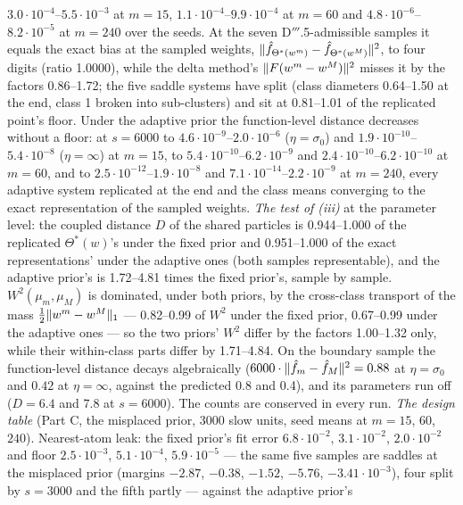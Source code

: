 $3.0\cdot10^{-4}$--$5.5\cdot10^{-3}$ at $m = 15$, $1.1\cdot10^{-4}$--$9.9\cdot10^{-4}$ at $m = 60$ and
$4.8\cdot10^{-6}$--$8.2\cdot10^{-5}$ at $m = 240$ over the seeds. At the seven D$'''$.5-admissible samples it equals
the exact bias at the sampled weights, $\lVert \hat f_{\Theta^*(w^m)} - \hat f_{\Theta^*(w^M)}\rVert^2$, to four digits
(ratio 1.0000), while the delta method's $\lVert F(w^m - w^M)\rVert^2$ misses it by the factors 0.86--1.72; the five saddle
systems have split (class diameters 0.64--1.50 at the end, class 1 broken into sub-clusters) and sit at 0.81--1.01 of
the replicated point's floor. Under the adaptive prior the function-level distance decreases without a floor: at
$s = 6000$ to $4.6\cdot10^{-9}$--$2.0\cdot10^{-6}$ ($\eta = \sigma_0$) and $1.9\cdot10^{-10}$--$5.4\cdot10^{-8}$
($\eta = \infty$) at $m = 15$, to $5.4\cdot10^{-10}$--$6.2\cdot10^{-9}$ and $2.4\cdot10^{-10}$--$6.2\cdot10^{-10}$ at
$m = 60$, and to $2.5\cdot10^{-12}$--$1.9\cdot10^{-8}$ and $7.1\cdot10^{-14}$--$2.2\cdot10^{-9}$ at $m = 240$, every
adaptive system replicated at the end and the class means converging to the exact representation of the sampled
weights. \emph{The test of (iii)} at the parameter level: the coupled distance $D$ of the shared particles is
0.944--1.000 of the replicated $\Theta^*(w)$'s under the fixed prior and 0.951--1.000 of the exact representations'
under the adaptive ones (both samples representable), and the adaptive prior's is 1.72--4.81 times the fixed prior's,
sample by sample. $W^2(\mu_m,\mu_M)$ is dominated, under both priors, by the cross-class transport of the mass
$\frac12\lVert w^m - w^M\rVert_1$ --- 0.82--0.99 of $W^2$ under the fixed prior, 0.67--0.99 under the adaptive ones --- so
the two priors' $W^2$ differ by the factors 1.00--1.32 only, while their within-class parts differ by 1.71--4.84. On
the boundary sample the function-level distance decays algebraically ($6000\cdot\lVert \hat f_m - \hat f_M\rVert^2 = 0.88$ at
$\eta = \sigma_0$ and $0.42$ at $\eta = \infty$, against the predicted 0.8 and 0.4), and its parameters run off
($D = 6.4$ and $7.8$ at $s = 6000$). The counts are conserved in every run. \emph{The design table} (Part C, the
misplaced prior, 3000 slow units, seed means at $m = 15$, $60$, $240$). Nearest-atom leak: the fixed prior's fit error
$6.8\cdot10^{-2}$, $3.1\cdot10^{-2}$, $2.0\cdot10^{-2}$ and floor $2.5\cdot10^{-3}$, $5.1\cdot10^{-4}$,
$5.9\cdot10^{-5}$ --- the same five samples are saddles at the misplaced prior (margins $-2.87$, $-0.38$, $-1.52$,
$-5.76$, $-3.41\cdot10^{-3}$), four split by $s = 3000$ and the fifth partly --- against the adaptive prior's
